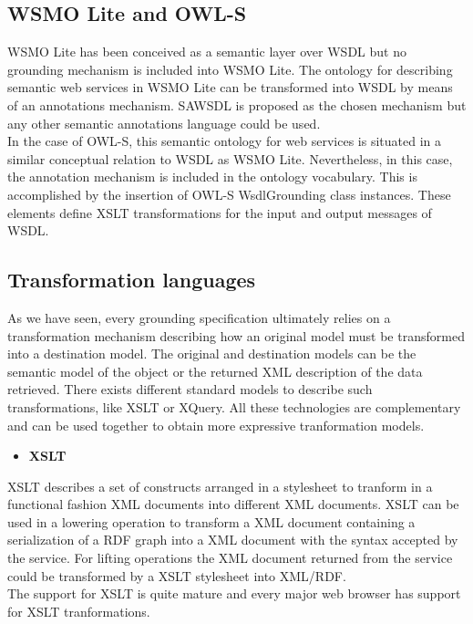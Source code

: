 \subsection{WSMO Lite and OWL-S}
WSMO Lite \cite{wsmolite} has been conceived as a semantic layer over WSDL but no grounding mechanism is included into WSMO Lite. The ontology for describing semantic web services in WSMO Lite can be transformed into WSDL by means of an annotations mechanism. SAWSDL is proposed as the chosen mechanism but any other semantic annotations language could be used.\\
In the case of OWL-S, this semantic ontology for web services is situated in a similar conceptual relation to WSDL as WSMO Lite. Nevertheless, in this case, the annotation mechanism is included in the ontology vocabulary. This is accomplished by the insertion of OWL-S WsdlGrounding class instances. These elements define XSLT transformations for the input and output messages of WSDL.

\subsection{Transformation languages}
As we have seen, every grounding specification ultimately relies on a transformation mechanism describing how an original model must be transformed into a destination model. The original and destination models can be the semantic model of the object or the returned XML description of the data retrieved. There exists different standard models to describe such transformations, like XSLT or XQuery. All these technologies are complementary and can be used together to obtain more expressive tranformation models.

\begin{itemize}
\item \bf{XSLT}
\end{itemize}

XSLT \cite{xslt} describes a set of constructs arranged in a stylesheet to tranform in a functional fashion XML documents into different XML documents. XSLT can be used in a lowering operation to transform a XML document containing a serialization of a RDF graph into a XML document with the syntax accepted by the service. For lifting operations the XML document returned from the service could be transformed by a XSLT stylesheet into XML/RDF.\\
The support for XSLT is quite mature and every major web browser has support for XSLT tranformations.

